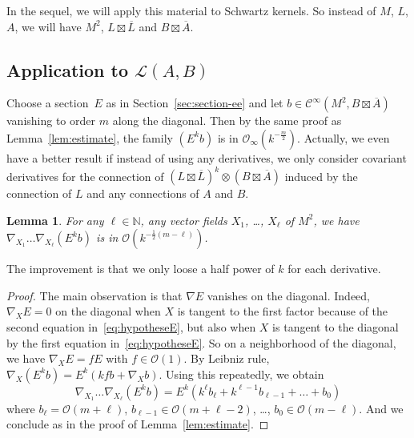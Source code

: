 \documentclass[10pt,a4paper]{article}
\newtheorem{lemm}[theo]{Lemma}
\theoremstyle{definition}
\numberwithin{equation}{section}
\newcommand{\N}{{\mathbb{N}}}
\newcommand{\con}{\overline}
\newcommand{\Ci}{{\mathcal{C}}^{\infty}}
\newcommand{\bigo}{\mathcal{O}}
\newcommand{\biginf}{\mathcal{O}_{\infty}}
\newcommand{\lag}{\mathcal{L}}
\begin{document}
In the sequel, we will apply this material to Schwartz kernels. So instead of $M$, $L$, $A$, we will have $M^2$, $L \boxtimes \con{L}$ and $B
\boxtimes \con{A}$. 

\subsection{Application to \texorpdfstring{$\lag (A,B)$}{L(A,B)}}

Choose a section~$E$ as in Section~\ref{sec:section-ee} and let $b \in \Ci (M^2, B \boxtimes \con{A})$ vanishing to order $m$ along the diagonal. Then by the same proof as Lemma~\ref{lem:estimate}, the family $ (E^k b)$ is in $\biginf (k^{-\frac{m}{2}})$. Actually, we even have a better result if instead of using any derivatives, we only consider covariant derivatives for the connection of $(L \boxtimes \con{L})^k \otimes (B \boxtimes \con{A})$ induced by the connection of $L$ and any connections of $A$ and $B$.

\begin{lemm}\label{lem:comp_der_lag}
For any $\ell \in \N$, any vector fields $X_1$, \ldots, $X_{\ell}$ of $M^2$, we have $ \nabla _{X_1} \ldots \nabla_{X_\ell} (E^k b) $ is in $\bigo (k^{-\frac{1}{2} (m - \ell)})$.
\end{lemm}

The improvement is that we only loose a half power of $k$ for each derivative.

\begin{proof}
The main observation is that $\nabla E $ vanishes on the
diagonal. Indeed, $\nabla_{X} E =0$ on the diagonal when $X$ is tangent to the first factor because of the second equation in~\eqref{eq:hypotheseE}, but also when $X$ is tangent to the diagonal by the first equation in~\eqref{eq:hypotheseE}. So on a neighborhood of the diagonal, we have  $\nabla_X E = f E$  with $f \in \bigo (1)$. By Leibniz rule, $ \nabla_X (E^k b) = E^k (k f b + \nabla_X b) $. Using this repeatedly, we obtain
\[
\nabla _{X_1} \ldots \nabla_{X_\ell} \left(E^k b\right) = E^k \left(k^{\ell} b_{\ell} +
k^{\ell -1} b_{\ell-1} + \ldots + b_0\right)
\]
where
$ b_{\ell} = \bigo (m+ \ell)$, $b_{\ell-1 } \in \bigo (m+ \ell - 2)$,
\ldots, $b_0 \in \bigo (m - \ell)$. And we conclude as in the proof of Lemma~\ref{lem:estimate}.
\end{proof}
\end{document}
